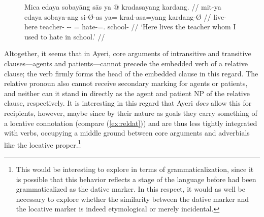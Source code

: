 \begin{figure}
\ex\label{ex:relpat}
\ljudge* \begingl
	\gla Mica edaya sobayāng sās ya @ kradasayang kardang. //
	\glb mit-ya edaya sobaya-ang si-Ø-as ya= krad-asa=yang kardang-Ø //
	\glc live-\TsgM{} here teacher-\Aarg{} \Rel{}-\Aarg{}-\Parg{} \LocT{}=
		hate-\Hab{}=\Fsg{}.\Aarg{} school-\Top{} //
% 
	\glft `Here lives the teacher whom I used to hate in school.' //
\endgl
\xe
\end{figure}

Altogether, it seems that in Ayeri, core arguments of intransitive and
transitive clauses---agents and patients---cannot precede the embedded verb of
a relative clause; the verb firmly forms the head of the embedded clause in
this regard. The relative pronoun also cannot receive secondary marking for
agents or patients, and neither can it stand in directly as the agent and
patient NP of the relative clause, respectively. It is interesting in this
regard that Ayeri \emph{does} allow this for recipients, however, maybe since
by their nature as goals they carry something of a locative connotation
(compare (\ref{ex:reldat})) and are thus less tightly integrated with verbs,
occupying a middle ground between core arguments and adverbials like the
locative proper.\footnote{This would be interesting to explore in terms of
grammaticalization, since it is possible that this behavior reflects a stage of
the language before  had been grammaticalized as the dative
marker. In this respect, it would as well be necessary to explore whether the
similarity between the dative marker  and the locative marker
 is indeed etymological or merely incidental.}


